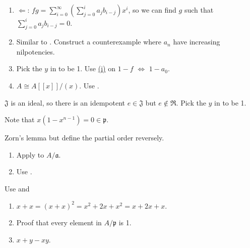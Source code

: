 \begin{exercise}\label{ex1.5}
	\begin{enumerate}[label=(\roman*),ref=\theexercise(\roman*)]
		\item\label{ex1.5.1} $\Leftarrow$: $fg=\sum_{i=0}^\infty\left(\sum_{j=0}^ia_jb_{i-j}\right)x^i$, so we can find $g$ such that $\sum_{j=0}^ia_jb_{i-j}=0$.
		\item\label{ex1.5.2} Similar to . Construct a counterexample where $a_n$ have increasing nilpotencies.
		\item Pick the $y$ in  to be 1. Use \hyperref[ex1.5.1]{(i)} on $1-f$ $\Leftrightarrow$ $1-a_0$.
		\item[(iv),(v)] $A\cong A[[x]]/(x)$. Use .
	\end{enumerate}
\end{exercise}

\begin{exercise}\label{ex1.6}
	$\mathfrak{J}$ is an ideal, so there is an idempotent $e\in\mathfrak{J}$ but $e\notin\mathfrak{R}$. Pick the $y$ in  to be 1.
\end{exercise}

\begin{exercise}\label{ex1.7}
	Note that $x\left(1-x^{n-1}\right)=0\in\mathfrak{p}$.
\end{exercise}

\begin{exercise}\label{ex1.8}
	Zorn's lemma but define the partial order reversely.
\end{exercise}

\begin{exercise}\label{ex1.9}
	\begin{enumerate}
		\item[$\Rightarrow$:] Apply  to $A/\mathfrak{a}$.
		\item[$\Leftarrow$:] Use .
	\end{enumerate}
\end{exercise}

\begin{exercise}\label{ex1.10}
	Use  and 
\end{exercise}

\begin{exercise}\label{ex1.11}
	\begin{enumerate}[label=(\roman*),ref=\theexercise(\roman*)]
		\item $x+x=(x+x)^2=x^2+2x+x^2=x+2x+x$.
		\item Proof that every element in $A/\mathfrak{p}$ is 1.
		\item\label{ex1.11.3} $x+y-xy$.
	\end{enumerate}
\end{exercise}

